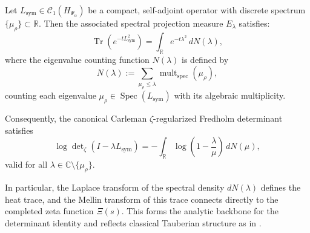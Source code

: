 \begin{lemma}
\label{lem:spectral_measure_heat_semigroup}
Let \( L_{\mathrm{sym}} \in \mathcal{C}_1(H_{\Psi_\alpha}) \) be a compact, self-adjoint operator with discrete spectrum \( \{ \mu_\rho \} \subset \mathbb{R} \). Then the associated spectral projection measure \( E_\lambda \) satisfies:
\[
\operatorname{Tr}(e^{-t L_{\mathrm{sym}}^2}) = \int_{\mathbb{R}} e^{-t\lambda^2} \, dN(\lambda),
\]
where the eigenvalue counting function \( N(\lambda) \) is defined by
\[
N(\lambda) := \sum_{\mu_\rho \leq \lambda} \operatorname{mult}_{\mathrm{spec}}(\mu_\rho),
\]
counting each eigenvalue \( \mu_\rho \in \operatorname{Spec}(L_{\mathrm{sym}}) \) with its algebraic multiplicity.

\medskip

\noindent
Consequently, the canonical Carleman \(\zeta\)-regularized Fredholm determinant satisfies
\[
\log \det\nolimits_{\zeta}(I - \lambda L_{\mathrm{sym}})
= - \int_{\mathbb{R}} \log\left(1 - \frac{\lambda}{\mu} \right) \, dN(\mu),
\]
valid for all \( \lambda \in \mathbb{C} \setminus \{ \mu_\rho \} \).

\medskip

\noindent
In particular, the Laplace transform of the spectral density \( dN(\lambda) \) defines the heat trace, and the Mellin transform of this trace connects directly to the completed zeta function \( \Xi(s) \). This forms the analytic backbone for the determinant identity and reflects classical Tauberian structure as in \cite{Korevaar2004Tauberian}.
\end{lemma}
